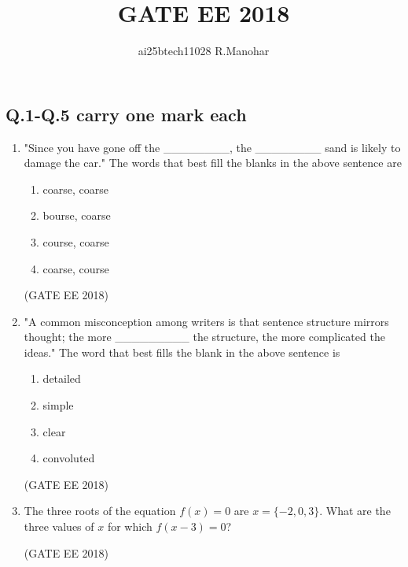 \documentclass[journal,12pt,onecolumn]{IEEEtran}
\title{GATE EE 2018}
\author{ai25btech11028 R.Manohar}
\theoremstyle{remark}
\begin{document}
\maketitle
\subsection{Q.1-Q.5 carry one mark each}
\begin{enumerate}
 \item "Since you have gone off the \_\_\_\_\_\_\_\_, the \_\_\_\_\_\_\_\_ sand is likely to damage the car." 
    The words that best fill the blanks in the above sentence are
    \begin{multicols}{4}
    \begin{enumerate}
        \item coarse, coarse
        \item bourse, coarse
        \item course, coarse
        \item coarse, course
    \end{enumerate}
    \end{multicols}
    \hfill{(GATE EE 2018)}

    \item "A common misconception among writers is that sentence structure mirrors thought; the more \_\_\_\_\_\_\_\_\_ the structure, the more complicated the ideas."
    The word that best fills the blank in the above sentence is
    \begin{multicols}{4}
    \begin{enumerate}
        \item detailed
        \item simple
        \item clear
        \item convoluted
    \end{enumerate}
   \end{multicols}
    \hfill{(GATE EE 2018)}

    \item The three roots of the equation $f(x) = 0$ are $x = \{-2, 0, 3\}$. What are the three values of $x$ for which $f(x - 3) = 0$?
    \begin{enumerate}
    \end{enumerate}
     \hfill{(GATE EE 2018)}


\end{enumerate}
\end{document}
